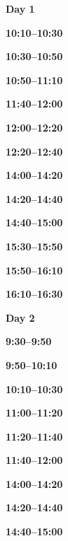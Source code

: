 \documentclass[12pt]{extbook}
\newcommand{\dayheader}[1]{
\clearpage
\begin{center}
\Large\bfseries Day #1
\end{center}
\bigskip}
\newcommand{\breaktime}[1]{
\bigskip
\begin{center}
\Large\bfseries ***** Break #1 *****
\end{center}
\bigskip}
\renewcommand{\breaktime}[1]{}
\newcommand{\abstract}[2]{{
\bigskip
\begin{center}
\large\bfseries #1
\end{center}}
\par

\clearpage
}
\begin{document}



\dayheader{1}

\abstract{10:10--10:30}{abstracts/Kipfer} %
\abstract{10:30--10:50}{abstracts/Daskalopoulou} %
\abstract{10:50--11:10}{abstracts/Kimani} %


\breaktime{30 min}

\abstract{11:40--12:00}{abstracts/Mtili} %
\abstract{12:00--12:20}{abstracts/Giroud} %
\abstract{12:20--12:40}{abstracts/Roques} %

\breaktime{ / Lunch}

\abstract{14:00--14:20}{abstracts/Lightfoot} %
\abstract{14:20--14:40}{abstracts/Dutoit} %
\abstract{14:40--15:00}{abstracts/Finger} %

\breaktime{30 min}

\abstract{15:30--15:50}{abstracts/Strauch_Zimmer} %
\abstract{15:50--16:10}{abstracts/vanRooyen} %
\abstract{16:10--16:30}{abstracts/Ortega} %




\dayheader{2}
\abstract{9:30--9:50}{abstracts/Jacops} %
\abstract{9:50--10:10}{abstracts/Tomonaga} %
\abstract{10:10--10:30}{abstracts/Kim} %

\breaktime{30 min}

\abstract{11:00--11:20}{abstracts/vanLeeuw} %
\abstract{11:20--11:40}{abstracts/Currle} %
\abstract{11:40--12:00}{abstracts/Wang} %

\breaktime{ / Lunch}

\abstract{14:00--14:20}{abstracts/Brennwald} %
\abstract{14:20--14:40}{abstracts/Blanc} %
\abstract{14:40--15:00}{abstracts/Marion} %
\end{document}
